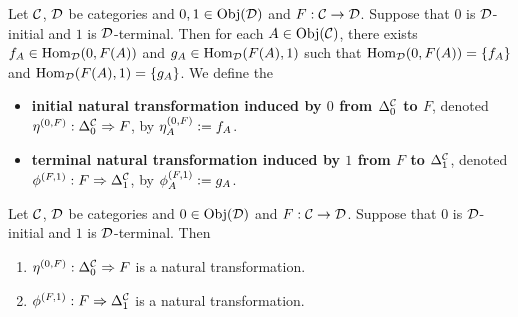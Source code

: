 \documentclass{book}
\begin{document}
	\begin{defn} 
		Let $\mathcal{C}$, $\mathcal{D}$ be categories and $0,1 \in \operatorname{Obj}(\mathcal{D})$ and $F: \mathcal{C} \rightarrow \mathcal{D}$. Suppose that $0$ is $\mathcal{D}$-initial and $1$ is $\mathcal{D}$-terminal. Then for each $A \in \operatorname{Obj}(\mathcal{C})$, there exists $f_A \in \operatorname{Hom}_{\mathcal{D}}(0, F(A))$ and $g_A \in \operatorname{Hom}_{\mathcal{D}}(F(A), 1)$ such that $\operatorname{Hom}_{\mathcal{D}}(0, F(A)) = \{f_A\}$ and $\operatorname{Hom}_{\mathcal{D}}(F(A), 1) = \{g_A\}$. We define the 
		\begin{itemize}
			\item \textbf{initial natural transformation induced by $0$ from $\Delta^{\mathcal{C}}_0$ to $F$}, denoted $\eta^{(0,F)}: \Delta^{\mathcal{C}}_0 \Rightarrow F$, by 
			$\eta^{(0,F)}_A \vcentcolon= f_A$.
			\item \textbf{terminal natural transformation induced by $1$ from $F$ to $\Delta^{\mathcal{C}}_1$}, denoted $\phi^{(F,1)}: F \Rightarrow \Delta^{\mathcal{C}}_1$, by 
			$\phi^{(F,1)}_A \vcentcolon= g_A$.
		\end{itemize}
	\end{defn}
	
	\begin{ex} 
		Let $\mathcal{C}$, $\mathcal{D}$ be categories and $0 \in \operatorname{Obj}(\mathcal{D})$ and $F: \mathcal{C} \rightarrow \mathcal{D}$. Suppose that $0$ is $\mathcal{D}$-initial and $1$ is $\mathcal{D}$-terminal. Then 
		\begin{enumerate}
			\item $\eta^{(0,F)}: \Delta^{\mathcal{C}}_0 \Rightarrow F$ is a natural transformation.
			\item $\phi^{(F,1)}: F \Rightarrow \Delta^{\mathcal{C}}_1$ is a natural transformation.
		\end{enumerate}
	\end{ex}
	
\end{document}
